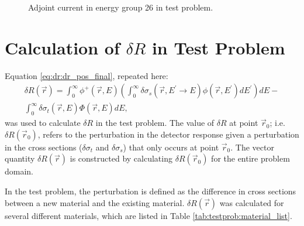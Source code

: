 \begin{figure}
\begin{minipage}{0.49\linewidth}
    \caption{Adjoint current in energy group 26 in test problem.}
    \label{fig:testprob:current_adj_g26}
  \end{minipage}
\end{figure}

\section{Calculation of $\delta R$ in Test Problem}
\label{sec:bg:tp:dr}

Equation \ref{eq:dr:dr_pos_final}, repeated here:
\begin{multline*}
  \delta R\left(\vec{r}\right) =
  \int_0^\infty\phi^+\left(\vec{r},E\right)\left(\int_0^\infty\delta\sigma_s\left(\vec{r},E^\prime\rightarrow E\right)\phi\left(\vec{r},E^\prime\right)dE^\prime\right)dE - \\
  \int_0^\infty\delta\sigma_t\left(\vec{r},E\right)\Phi\left(\vec{r},E\right)dE,
\end{multline*}
was used to calculate $\delta R$ in the test problem.
The value of $\delta R$ at point $\vec{r}_0$; i.e. $\delta R\left(\vec{r}_0\right)$, refers to the perturbation in the detector response given a perturbation in the cross sections ($\delta \sigma_t$ and $\delta \sigma_s$) that only occurs at point $\vec{r}_0$.
The vector quantity $\delta R\left(\vec{r}\right)$ is constructed by calculating $\delta R\left(\vec{r}_0\right)$ for the entire problem domain.

In the test problem, the perturbation is defined as the difference in cross sections between a new material and the existing material.
$\delta R\left(\vec{r}\right)$ was calculated for several different materials, which are listed in Table \ref{tab:testprob:material_list}.

